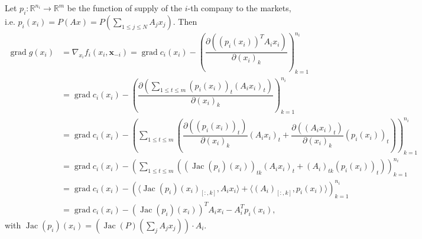 Let $p_i: \mathbb{R}^{n_i} \to \mathbb{R}^m$ be the function of supply of the $i$-th company to the markets, i.e. $p_i(x_i) = P(Ax) = P\left(\sum\limits_{1 \leqslant j \leqslant N} A_jx_j\right)$. Then
\begin{align*}
\operatorname{grad} g(x_i) & = \nabla_{x_i} f_i(x_i, \mathbf{x}_{-i}) = \operatorname{grad} c_i(x_i) - \left( \dfrac{\partial \left( (p_i(x_i))^T A_ix_i \right)}{\partial (x_i)_k} \right)_{k=1}^{n_i} \\
& = \operatorname{grad} c_i(x_i) - \left( \dfrac{\partial \left( \sum\limits_{1\leqslant t \leqslant m} (p_i(x_i))_t (A_ix_i)_t \right)}{\partial (x_i)_k} \right)_{k=1}^{n_i} \\
& = \operatorname{grad} c_i(x_i) - \left( \sum\limits_{1\leqslant t \leqslant m}\left( \dfrac{\partial \left( (p_i(x_i))_t \right)}{\partial (x_i)_k} (A_ix_i)_t + \dfrac{\partial \left( (A_ix_i)_t \right)}{\partial (x_i)_k} (p_i(x_i))_t \right) \right)_{k=1}^{n_i} \\
& = \operatorname{grad} c_i(x_i) - \left( \sum\limits_{1\leqslant t \leqslant m}\left( \left(\operatorname{Jac} (p_i)(x_i) \right)_{tk} (A_ix_i)_t + (A_i)_{tk} (p_i(x_i))_t \right) \right)_{k=1}^{n_i} \\
& = \operatorname{grad} c_i(x_i) - \left( \langle \operatorname{Jac}(p_i)(x_i)_{[:,k]}, A_ix_i \rangle + \langle (A_i)_{[:,k]}, p_i(x_i) \rangle \right)_{k=1}^{n_i} \\
& =\operatorname{grad} c_i(x_i) - \left( \operatorname{Jac}(p_i)(x_i) \right)^T A_ix_i - A_i^T p_i(x_i),
\end{align*}
with $\operatorname{Jac}(p_i)(x_i) = \left( \operatorname{Jac}(P)\left(\sum\limits_j A_jx_j\right) \right) \cdot A_i$.


